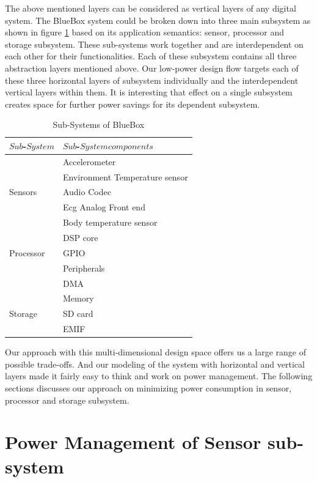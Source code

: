  
\hspace{10mm}The above mentioned layers can be considered as vertical layers of any digital system. The BlueBox system could be broken down into three main subsystem as shown in figure \ref{table:sub-system} based on its application semantics: sensor, processor and storage subsystem. These sub-systems work together and are interdependent on each other for their functionalities. Each of these subsystem contains all three abstraction layers mentioned above. Our low-power design flow targets each of these three horizontal layers of subsystem individually and the interdependent vertical layers within them. It is interesting that effect on a single subsystem creates space for further power savings for its dependent subsystem. 
 
  \begin{table}
 	\centering
 	\begin{tabular}{|l|l|}
 		\hline
 		$Sub$-$System$ & $Sub$-$System  components$  \\
 		\hline
 		& Accelerometer \\
 		& Environment Temperature sensor \\
 		Sensors & Audio Codec \\
 		& Ecg Analog Front end \\
 		& Body temperature sensor\\
 		\hline
 		& DSP core \\
 		Processor & GPIO \\
 		& Peripherals \\
 		& DMA \\
 		& Memory \\
 		\hline
 		Storage & SD card \\
 		& EMIF \\
 		\hline
 	\end{tabular}
 	\caption{Sub-Systems of BlueBox}
 	\label{table:sub-system}
 \end{table}
 
 
\hspace{10mm}Our approach with this multi-dimensional design space offers us a large range of possible trade-offs. And our modeling of the system with horizontal and vertical layers made it fairly easy to think and work on power management. The following sections discusses our approach on minimizing power consumption in sensor, processor and storage subsystem.
 
 \section{Power Management of Sensor sub-system}
 
